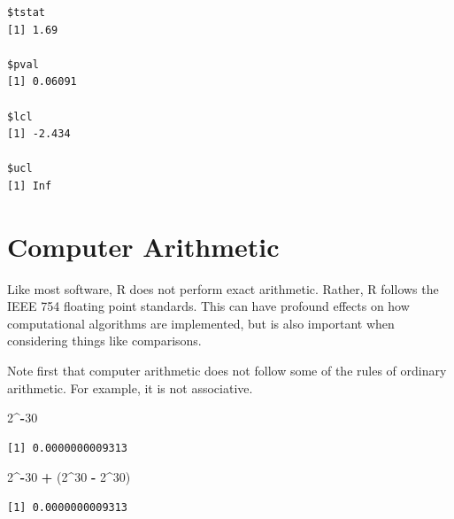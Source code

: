 \documentclass[
]{krantz}
\makeatletter
\newenvironment{Shaded}{\begin{snugshade}}{\end{snugshade}}
\newcommand{\DataTypeTok}[1]{\textcolor[rgb]{0.27,0.27,0.27}{#1}}
\newcommand{\DecValTok}[1]{\textcolor[rgb]{0.06,0.06,0.06}{#1}}
\newcommand{\KeywordTok}[1]{\textcolor[rgb]{0.27,0.27,0.27}{\textbf{#1}}}
\newcommand{\NormalTok}[1]{#1}
\newcommand{\OperatorTok}[1]{\textcolor[rgb]{0.43,0.43,0.43}{\textbf{#1}}}
\newcommand{\StringTok}[1]{\textcolor[rgb]{0.5,0.5,0.5}{#1}}
\newenvironment{kframe}{%
\medskip{}
\setlength{\fboxsep}{.8em}
 \def\at@end@of@kframe{}%
 \ifinner\ifhmode%
  \def\at@end@of@kframe{\end{minipage}}%
  \begin{minipage}{\columnwidth}%
 \fi\fi%
 \def\FrameCommand##1{\hskip\@totalleftmargin \hskip-\fboxsep
 \colorbox{shadecolor}{##1}\hskip-\fboxsep
     \hskip-\linewidth \hskip-\@totalleftmargin \hskip\columnwidth}%
 \MakeFramed {\advance\hsize-\width
   \@totalleftmargin\z@ \linewidth\hsize
   \@setminipage}}%
 {\par\unskip\endMakeFramed%
 \at@end@of@kframe}
\renewenvironment{Shaded}{\begin{kframe}}{\end{kframe}}
\makeatother
\begin{document}
\begin{Shaded}
\end{Shaded}

\begin{verbatim}
$tstat
[1] 1.69

$pval
[1] 0.06091

$lcl
[1] -2.434

$ucl
[1] Inf
\end{verbatim}

\hypertarget{arith}{%
\section{Computer Arithmetic}\label{arith}}

Like most software, R does not perform exact arithmetic. Rather, R follows the IEEE 754 floating point standards. This can have profound effects on how computational algorithms are implemented, but is also important when considering things like comparisons.

Note first that computer arithmetic does not follow some of the rules of ordinary arithmetic. For example, it is not associative.

\begin{Shaded}
\begin{Highlighting}[]
\DecValTok{2}\OperatorTok{\^{}{-}}\DecValTok{30}
\end{Highlighting}
\end{Shaded}

\begin{verbatim}
[1] 0.0000000009313
\end{verbatim}

\begin{Shaded}
\begin{Highlighting}[]
\DecValTok{2}\OperatorTok{\^{}{-}}\DecValTok{30} \OperatorTok{+}\StringTok{ }\NormalTok{(}\DecValTok{2}\OperatorTok{\^{}}\DecValTok{30} \OperatorTok{{-}}\StringTok{ }\DecValTok{2}\OperatorTok{\^{}}\DecValTok{30}\NormalTok{)}
\end{Highlighting}
\end{Shaded}

\begin{verbatim}
[1] 0.0000000009313
\end{verbatim}
\end{document}
